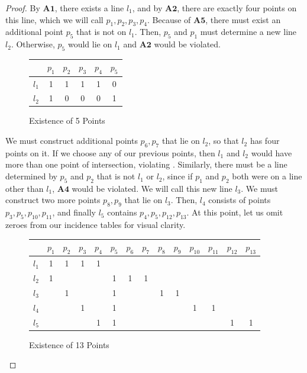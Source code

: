 \documentclass{article}
\begin{document}
 \begin{proof}
 By $\mathbf{A1}$, there exists a line $l_1$, and by $\mathbf{A2}$, there are exactly four points on this line, which we will call $p_1, p_2, p_3, p_4$. Because of $\mathbf{A5}$, there must exist an additional point $p_5$ that is not on $l_1$. Then, $p_5$ and $p_1$ must determine a new line $l_2$. Otherwise, $p_5$ would lie on $l_1$ and $\mathbf{A2}$ would be violated. 
 \begin{figure}[h]
 \caption{Existence of 5 Points}
 \begin{center}
\begin{tabular}{ c|c|c|c|c|c } 
 
  & $p_1$ & $p_2$ & $p_3$ &$p_4$ &$p_5$\\ 
 \hline
 $l_1$ & 1 & 1 & 1 & 1 & 0\\
 \hline
 $l_2$ & 1 & 0 & 0 & 0& 1\\
\end{tabular}
\end{center}
\end{figure}
We must construct additional points $p_6, p_7$ that lie on $l_2$, so that $l_2$ has four points on it. If we choose any of our previous points, then $l_1$ and $l_2$ would have more than one point of intersection, violating . Similarly, there must be a line determined by $p_5$ and $p_2$ that is not $l_1$ or $l_2$, since if $p_1$ and $p_2$ both were on a line other than $l_1$, $\mathbf{A4}$ would be violated. We will call this new line $l_3$. We must construct two more points $p_8, p_9$ that lie on $l_3$. Then, $l_4$ consists of points $p_3, p_5, p_{10}, p_{11}$, and finally $l_5$ contains $p_4, p_5, p_{12}, p_{13}$. At this point, let us omit zeroes from our incidence tables for visual clarity.
\begin{figure}[h]
\caption{Existence of 13 Points}
\begin{center}
\begin{tabular}{ c|c|c|c|c|c|c|c|c|c|c|c|c|c } 
 
  & $p_1$ & $p_2$ & $p_3$ &$p_4$ &$p_5$ &$p_6$ &$p_7$ &$p_8$ &$p_9$  &$p_{10}$&$p_{11}$&$p_{12}$&$p_{13}$ \\ 
\hline
 $l_1$ & 1 & 1 & 1 & 1 &  &&& &&&&& \\ 
 \hline
 $l_2$ & 1 & &&&1&1&1&&&&&& \\
 \hline
 $l_3$ & &1&&&1&&&1&1&&&&\\
 \hline
 $l_4$ &  &  & 1 &  &1 & &&&&1&1&&\\
 \hline
 $l_5$ & &&&1&1&&&&&&&1&1\\



\end{tabular}
\end{center}
\end{figure}
\end{proof}
\end{document}
